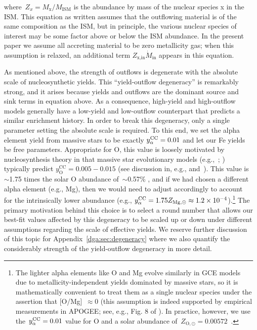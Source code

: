 where~$Z_x = M_\text{x} / M_\text{ISM}$ is the abundance by mass of the nuclear
species x in the ISM.
This equation as written assumes that the outflowing material is of the same
composition as the ISM, but in principle, the various nuclear species of
interest may be some factor above or below the ISM abundance.
In the present paper we assume all accreting material to be zero metallicity
gas; when this assumption is relaxed, an additional term
$Z_\text{x,in}\dot{M}_\text{in}$ appears in this equation.
\par
As mentioned above, the strength of outflows is degenerate with the absolute
scale of nucleosynthetic yields.
This ``yield-outflow degeneracy'' is remarkably strong, and it arises because
yields and outflows are the dominant source and sink terms in equation
 above.
As a consequence, high-yield and high-outflow models generally have a
low-yield and low-outflow counterpart that predicts a similar enrichment
history.
In order to break this degeneracy, only a single parameter setting the absolute
scale is required.
To this end, we set the alpha element yield from massive stars to be exactly
$y_\alpha^\text{CC} = 0.01$ and let our Fe yields be free parameters.
Appropriate for O, this value is loosely motivated by nucleosynthesis theory in
that massive star evolutionary models (e.g.,~\citealp*{Nomoto2013};
\citealp{Sukhbold2016, Limongi2018}) typically predict
$y_\text{O}^\text{CC} = 0.005 - 0.015$ (see discussion in, e.g.,
\citealp{Weinberg2017b} and~\citealp{Johnson2020}).
This value is~$\sim$1.75 times the solar O abundance of~$\sim$0.57\%
\citep{Asplund2009}, and if we had chosen a different alpha element (e.g., Mg),
then we would need to adjust accordingly to account for the intrinsically lower
abundance (e.g., $y_\alpha^\text{CC} = 1.75 Z_{\text{Mg},\odot} \approx
1.2\times10^{-4}$).\footnote{
	The lighter alpha elements like O and Mg evolve similarly in GCE models due
	to metallicity-independent yields dominated by massive stars, so it is
	mathematically convenient to treat them as a single nuclear species
	under the assertion that [O/Mg]~$\approx 0$ (this assumption is indeed
	supported by empirical measurements in APOGEE; see, e.g., Fig. 8 of
	\citealt{Weinberg2019}).
	In practice, however, we use the~$y_\alpha^\text{CC} = 0.01$ value for O and a solar
	abundance of~$Z_{\text{O},\odot} = 0.00572$~\citep{Asplund2009}.
}
The primary motivation behind this choice is to select a round number that
allows our best-fit values affected by this degeneracy to be scaled up or down
under different assumptions regarding the scale of effective yields.
We reserve further discussion of this topic for Appendix~\ref{dga:sec:degeneracy}
where we also quantify the considerably strength of the yield-outflow
degeneracy in more detail.


